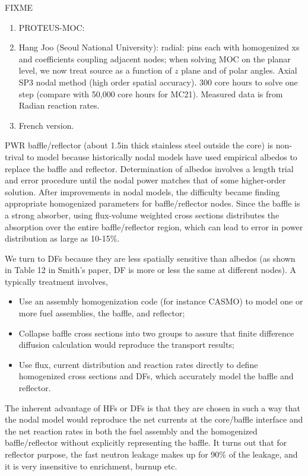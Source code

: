 \documentclass{school-22.211-notes}
\begin{document}
FIXME
\begin{enumerate}
\item PROTEUS-MOC:
\item Hang Joo (Seoul National University): radial: pins each with homogenized xs and coefficients coupling adjacent nodes; when solving MOC on the planar level, we now treat source as a function of $z$ plane and of polar angles. Axial SP3 nodal method (high order spatial accuracy). 300 core hours to solve one step (compare with 50,000 core hours for MC21). Measured data is from Radian reaction rates. 
\item French version. 
\end{enumerate}



\clearpage
{}
PWR baffle/reflector (about 1.5in thick stainless steel outside the core) is non-trival to model because historically nodal models have used empirical albedos to replace the baffle and reflector. Determination of albedos involves a length trial and error procedure until the nodal power matches that of some higher-order solution. After improvements in nodal models, the difficulty became finding appropriate homogenized parameters for baffle/reflector nodes. Since the baffle is a strong absorber, using flux-volume weighted cross sections distributes the absorption over the entire baffle/reflector region, which can lead to error in power distribution as large as 10-15\%. 

We turn to DFs because they are less spatially sensitive than albedos (as shown in Table 12 in Smith's paper, DF is more or less the same at different nodes). A typically treatment involves, 
\begin{itemize}
\item Use an assembly homogenization code (for instance CASMO) to model one or more fuel assemblies, the baffle, and reflector; 
\item Collapse baffle cross sections into two groups to assure that finite difference diffusion calculation would reproduce the transport results;  
\item Use flux, current distribution and reaction rates directly to define homogenized cross sections and DFs, which accurately model the baffle and reflector. 
\end{itemize}
The inherent advantage of HFs or DFs is that they are chosen in such a way that the nodal model would reproduce the net currents at the core/baffle interface and the net reaction rates in both the fuel assembly and the homogenized baffle/reflector without explicitly representing the baffle. It turns out that for reflector purpose, the fast neutron leakage makes up for 90\% of the leakage, and it is very insensitive to enrichment, burnup etc. 
\end{document}
